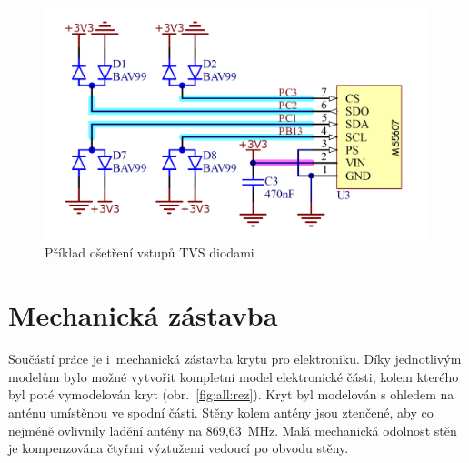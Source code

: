 \documentclass[twoside]{ctuthesis}
\theoremstyle{plain}
\theoremstyle{definition}
\theoremstyle{note}
\begin{document}
		\begin{figure}
			\centering
			\includegraphics[width = .55\textwidth]{Figures/osetreni_vstupu.png}
			\caption{Příklad ošetření vstupů TVS diodami}
			\label{fig:osetreni:vstupu}
		\end{figure}




	\section{Mechanická zástavba}
	Součástí práce je i~mechanická zástavba krytu pro elektroniku. 
	Díky jednotlivým modelům bylo možné vytvořit kompletní model elektronické části, kolem kterého byl poté vymodelován kryt (obr.~\ref{fig:all:rez}). Kryt byl modelován s ohledem na anténu umístěnou ve spodní části. Stěny kolem antény jsou ztenčené, aby co nejméně ovlivnily ladění antény na 869{,}63~MHz. Malá mechanická odolnost stěn je kompenzována čtyřmi výztužemi vedoucí po obvodu stěny.
\end{document}

